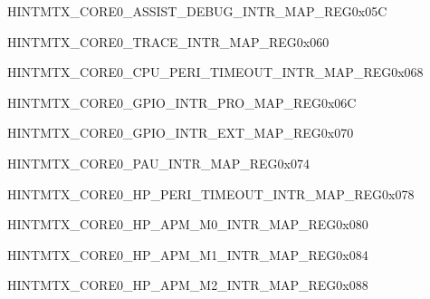 \begin{register}{H}{INTMTX\_CORE0\_ASSIST\_DEBUG\_INTR\_MAP\_REG}{0x05C}\label{regdesc:INTMTXCORE0ASSISTDEBUGINTRMAPREG} \end{register}\vspace{-3em}
\begin{register}{H}{INTMTX\_CORE0\_TRACE\_INTR\_MAP\_REG}{0x060}\label{regdesc:INTMTXCORE0TRACEINTRMAPREG} \end{register}\vspace{-3em}
\begin{register}{H}{INTMTX\_CORE0\_CPU\_PERI\_TIMEOUT\_INTR\_MAP\_REG}{0x068}\label{regdesc:INTMTXCORE0CPUPERITIMEOUTINTRMAPREG} \end{register}\vspace{-3em}
\begin{register}{H}{INTMTX\_CORE0\_GPIO\_INTR\_PRO\_MAP\_REG}{0x06C}\label{regdesc:INTMTXCORE0GPIOINTRPROMAPREG} \end{register}\vspace{-3em}
\begin{register}{H}{INTMTX\_CORE0\_GPIO\_INTR\_EXT\_MAP\_REG}{0x070}\label{regdesc:INTMTXCORE0GPIOINTREXTMAPREG} \end{register}\vspace{-3em}
\begin{register}{H}{INTMTX\_CORE0\_PAU\_INTR\_MAP\_REG}{0x074}\label{regdesc:INTMTXCORE0PAUINTRMAPREG} \end{register}\vspace{-3em}
\begin{register}{H}{INTMTX\_CORE0\_HP\_PERI\_TIMEOUT\_INTR\_MAP\_REG}{0x078}\label{regdesc:INTMTXCORE0HPPERITIMEOUTINTRMAPREG} \end{register}\vspace{-3em}
\begin{register}{H}{INTMTX\_CORE0\_HP\_APM\_M0\_INTR\_MAP\_REG}{0x080}\label{regdesc:INTMTXCORE0HPAPMM0INTRMAPREG} \end{register}\vspace{-3em}
\begin{register}{H}{INTMTX\_CORE0\_HP\_APM\_M1\_INTR\_MAP\_REG}{0x084}\label{regdesc:INTMTXCORE0HPAPMM1INTRMAPREG} \end{register}\vspace{-3em}
\begin{register}{H}{INTMTX\_CORE0\_HP\_APM\_M2\_INTR\_MAP\_REG}{0x088}\label{regdesc:INTMTXCORE0HPAPMM2INTRMAPREG} \end{register}\vspace{-3em}
